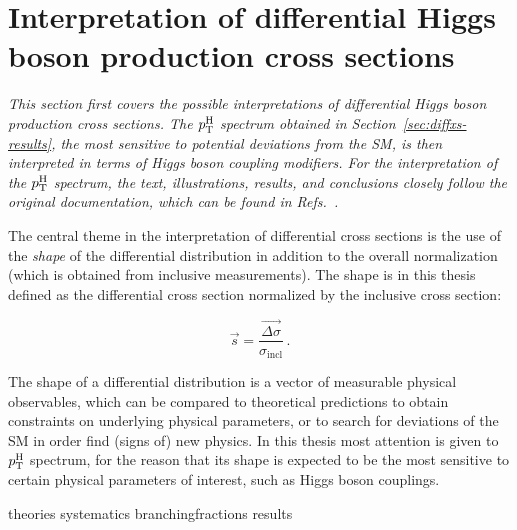 \section{Interpretation of differential Higgs boson production cross sections}
\label{sec:interpretation}

\emph{%
This section first covers the possible interpretations of differential Higgs boson production cross sections.
%
The $p_\mathrm{T}^\mathrm{H}$ spectrum obtained in Section~\ref{sec:diffxs-results}, the most sensitive to potential deviations from the SM, is then interpreted in terms of Higgs boson coupling modifiers.
% 
For the interpretation of the $p_\mathrm{T}^\mathrm{H}$ spectrum, the text, illustrations, results, and conclusions closely follow the original documentation, which can be found in Refs.~\cite{AN-17-244,HIG-17-028}.
}


The central theme in the interpretation of differential cross sections is the use of the \emph{shape} of the differential distribution in addition to the overall normalization (which is obtained from inclusive measurements).
% 
The shape is in this thesis defined as the differential cross section normalized by the inclusive cross section:
% 
\begin{linenomath*}
\begin{equation}
\label{eq:interpretation-shape}
\vec{s} = \frac{\vec{\Delta\sigma}}{\sigma_\text{incl}}
\,.
\end{equation}
\end{linenomath*}
% 
The shape of a differential distribution is a vector of measurable physical observables, which can be compared to theoretical predictions to obtain constraints on underlying physical parameters, or to search for deviations of the SM in order find (signs of) new physics.
% 
In this thesis most attention is given to $p_\mathrm{T}^\mathrm{H}$ spectrum, for the reason that its shape is expected to be the most sensitive to certain physical parameters of interest, such as Higgs boson couplings.



{theories}
{systematics}
{branchingfractions}
{results}